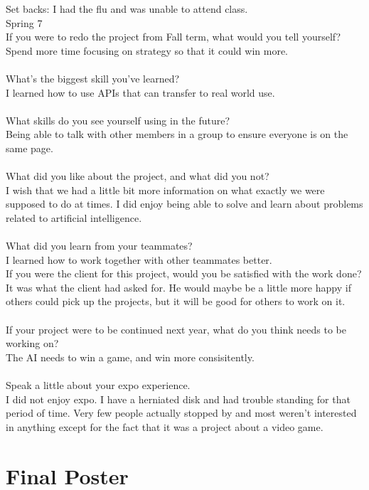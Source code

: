 \documentclass[10pt,letterpaper,onecolumn,draftclsnofoot]{IEEEtran}
\begin{document}
Set backs: I had the flu and was unable to attend class.\\
Spring 7 \\
If you were to redo the project from Fall term, what would you tell yourself?\\
Spend more time focusing on strategy so that it could win more.\\
\\
What's the biggest skill you've learned?\\
I learned how to use APIs that can transfer to real world use.\\
\\
What skills do you see yourself using in the future?\\
Being able to talk with other members in a group to ensure everyone is on the same page.\\
\\
What did you like about the project, and what did you not?\\
I wish that we had a little bit more information on what exactly we were supposed to do at times. I did enjoy being able to solve and learn about problems related to artificial intelligence.\\
\\
What did you learn from your teammates?\\
I learned how to work together with other teammates better.
\\
If you were the client for this project, would you be satisfied with the work done?\\
It was what the client had asked for. He would maybe be a little more happy if others could pick up the projects, but it will be good for others to work on it.\\
\\
If your project were to be continued next year, what do you think needs to be working on?\\
The AI needs to win a game, and win more consisitently.\\
\\
Speak a little about your expo experience.\\
I did not enjoy expo. I have a herniated disk and had trouble standing for that period of time. Very few people actually stopped by and most weren't interested in anything except for the fact that it was a project about a video game.
\section{Final Poster}
\end{document}
